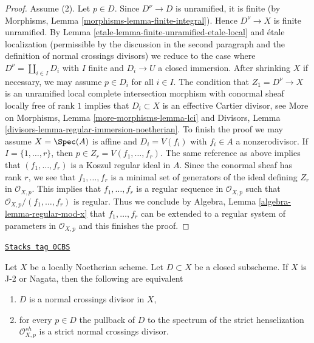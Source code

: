 \begin{proof}
\medskip\noindent
Assume (2). Let $p \in D$. Since $D^\nu \to D$ is unramified, it is
finite (by Morphisms, Lemma \ref{morphisms-lemma-finite-integral}).
Hence $D^\nu \to X$ is finite unramified.
By Lemma \ref{etale-lemma-finite-unramified-etale-local}
and \'etale localization (permissible by the discussion
in the second paragraph and the definition of normal
crossings divisors) we reduce to the case where
$D^\nu = \coprod_{i \in I} D_i$
with $I$ finite and $D_i \to U$ a closed immersion.
After shrinking $X$ if necessary, we may assume
$p \in D_i$ for all $i \in I$. The condition that $Z_1 =  D^\nu \to X$ is an
unramified local complete intersection morphism
with conormal sheaf locally free of rank $1$
implies that $D_i \subset X$ is an effective Cartier divisor, see
More on Morphisms, Lemma \ref{more-morphisms-lemma-lci} and
Divisors, Lemma \ref{divisors-lemma-regular-immersion-noetherian}.
To finish the proof we may assume $X = \Spec(A)$ is affine
and $D_i = V(f_i)$ with $f_i \in A$ a nonzerodivisor.
If $I = \{1, \ldots, r\}$, then $p \in Z_r = V(f_1, \ldots, f_r)$.
The same reference as above implies that
$(f_1, \ldots, f_r)$ is a Koszul regular ideal in $A$.
Since the conormal sheaf has rank $r$, we see that
$f_1, \ldots, f_r$ is a minimal set of generators of
the ideal defining $Z_r$ in $\mathcal{O}_{X, p}$.
This implies that $f_1, \ldots, f_r$ is a regular sequence
in $\mathcal{O}_{X, p}$ such that $\mathcal{O}_{X, p}/(f_1, \ldots, f_r)$
is regular. Thus we conclude by
Algebra, Lemma \ref{algebra-lemma-regular-mod-x}
that $f_1, \ldots, f_r$ can be extended to a regular system of parameters
in $\mathcal{O}_{X, p}$ and this finishes the proof.
\end{proof}

\begin{lemma}
\label{etale-lemma-characterize-normal-crossings}
\href{https://stacks.math.columbia.edu/tag/0CBS}{\texttt{Stacks tag 0CBS}}

Let $X$ be a locally Noetherian scheme. Let $D \subset X$ be a closed
subscheme. If $X$ is J-2 or Nagata, then the following are equivalent
\begin{enumerate}
\item $D$ is a normal crossings divisor in $X$,
\item for every $p \in D$ the pullback of $D$ to the spectrum of the
strict henselization $\mathcal{O}_{X, p}^{sh}$
is a strict normal crossings divisor.
\end{enumerate}
\end{lemma}

